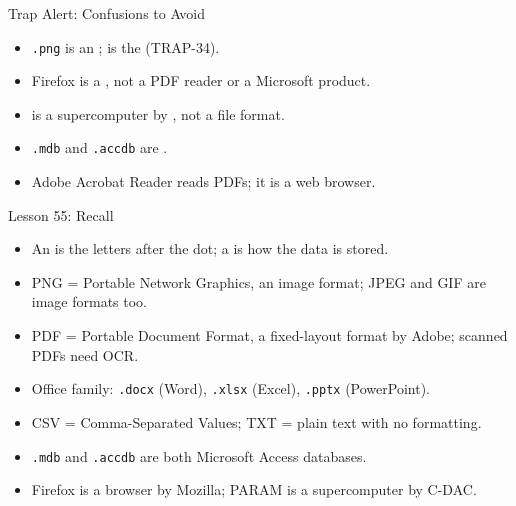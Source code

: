 \documentclass[aspectratio=169]{beamer}
\begin{document}
\begin{frame}{Trap Alert: Confusions to Avoid}
  \begin{itemize}
    \item \texttt{.png} is an ;  is the 
      (TRAP-34).
    \item Firefox is a , not a PDF reader or a
      Microsoft product.
    \item {} is a supercomputer by , not a file format.
    \item \texttt{.mdb} and \texttt{.accdb} are .
    \item Adobe Acrobat Reader reads PDFs; it is  a web browser.
  \end{itemize}
\end{frame}

\begin{frame}{Lesson 55: Recall}
  \begin{itemize}
    \item An  is the letters after the dot; a  is
      how the data is stored.
    \item PNG = Portable Network Graphics, an image format; JPEG and GIF are
      image formats too.
    \item PDF = Portable Document Format, a fixed-layout format by Adobe;
      scanned PDFs need OCR.
    \item Office family: \texttt{.docx} (Word), \texttt{.xlsx} (Excel),
      \texttt{.pptx} (PowerPoint).
    \item CSV = Comma-Separated Values; TXT = plain text with no formatting.
    \item \texttt{.mdb} and \texttt{.accdb} are both Microsoft Access
      databases.
    \item Firefox is a browser by Mozilla; PARAM is a supercomputer by
      C-DAC.
  \end{itemize}
\end{frame}
\end{document}
